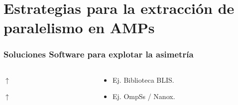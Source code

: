 \documentclass[10pt]{beamer}
\begin{document}
\section{Estrategias para la extracción de paralelismo en AMPs}
\begin{frame}
  \frametitle{Soluciones Software para explotar la asimetría}
  
  \begin{columns}[onlytextwidth]
    \begin{column}{0.6\textwidth}
      \centering
      \fboxsep=4mm \fboxrule=1mm
      
      $\uparrow$
      
      
      $\uparrow$
      
    \end{column}
    
    
    \begin{column}{0.4\textwidth}
      \footnotesize
      \begin{itemize}
      \item Ej. Biblioteca BLIS.
      \end{itemize}
      
      \vspace{0.3cm}
      \hrulefill
      \vspace{0.3cm}
      
      \begin{itemize}
      \item Ej. OmpSs / Nanox.
      \end{itemize}
      
      \vspace{0.3cm}
      \hrulefill
      \vspace{0.3cm}
      

\end{column}
\end{columns}
\end{frame}
\end{document}
